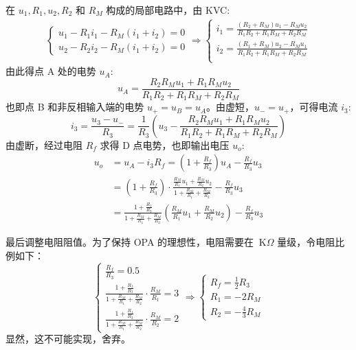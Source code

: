 \documentclass[UTF8]{report}
\def\KO{\ \mathrm{K}\Omega}
\theoremstyle{MyLineTheoremStyle} %
\theoremstyle{MyBlockTheoremStyle} %
\theoremstyle{MySubsubsectionStyle} %
\begin{document}
在 $u_1, R_1, u_2, R_2 $ 和 $R_M$ 构成的局部电路中，由 KVC:
\begin{gather}
\begin{cases}
    u_1 - R_1i_1 - R_M(i_1 + i_2) = 0 \\
u_2 - R_2i_2 - R_M(i_1 + i_2) = 0
\end{cases}
\Longrightarrow 
\begin{cases}
    i_1 = \frac{(R_2+R_M)u_1 - R_Mu_2}{R_1R_2 +R_1R_M + R_2R_M} \\ 
    i_2 = \frac{(R_1+R_M)u_2 - R_Mu_1}{R_1R_2 +R_1R_M + R_2R_M} \\ 
\end{cases}
\end{gather}
由此得点 A 处的电势 $u_A$:
\begin{equation}
    u_A = \frac{R_2R_Mu_1 + R_1R_Mu_2}{R_1R_2 +R_1R_M + R_2R_M}
\end{equation}
也即点 B 和非反相输入端的电势 $u_+ = u_B = u_A$。由虚短，$u_- = u_+$，可得电流 $i_3$:
\begin{equation}
i_3 = \frac{u_3 - u_-}{R_3} = \frac{1}{R_3}(u_3 - \frac{R_2R_Mu_1 + R_1R_Mu_2}{R_1R_2 +R_1R_M + R_2R_M}) 
\end{equation}
由虚断，经过电阻 $R_f$ 求得 D 点电势，也即输出电压 $u_o$:
\begin{align}
u_o &= u_A - i_3R_f = (1+\frac{R_f}{R_3})u_A - \frac{R_f}{R_3}u_3 
\\
&= (1+\frac{R_f}{R_3})\cdot \frac{\frac{R_M}{R_1}u_1 + \frac{R_M}{R_2}u_2}{1 + \frac{R_M}{R_1} + \frac{R_M}{R_2}} - \frac{R_f}{R_3}u_3
\\ 
&=\frac{1+\frac{R_f}{R_3}}{1 + \frac{R_M}{R_1} + \frac{R_M}{R_2}}
\left( \frac{R_M}{R_1}u_1 + \frac{R_M}{R_2}u_2  \right) - \frac{R_f}{R_3}u_3
\end{align}

最后调整电阻阻值。为了保持 OPA 的理想性，电阻需要在 $\KO$ 量级，令电阻比例如下：
\begin{equation}
\begin{cases}
    \frac{R_f}{R_3} = 0.5 \\ 
    \frac{1+\frac{R_f}{R_3}}{1 + \frac{R_M}{R_1} + \frac{R_M}{R_2}}\cdot \frac{R_M}{R_1} = 3 \\ 
    \frac{1+\frac{R_f}{R_3}}{1 + \frac{R_M}{R_1} + \frac{R_M}{R_2}}\cdot \frac{R_M}{R_2} = 2
\end{cases}\Longrightarrow 
\begin{cases}
    R_f = \frac{1}{2}R_3 \\ 
    R_1 =  -2R_M\\ 
    R_2 = -\frac{4}{3}R_M
\end{cases}
\end{equation}
显然，这不可能实现，舍弃。
\end{document}
